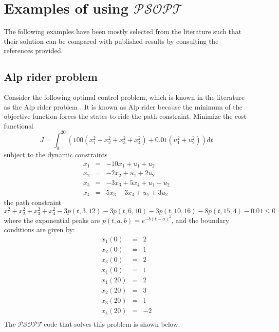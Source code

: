 \documentclass[a4paper,11pt]{report}    %
\newcommand{\psopt}{$\mathcal{PSOPT}$\,}  %
\begin{document}
\chapter{Examples of using  \psopt}

The following examples have been mostly selected from the literature such that their solution
can be compared with published results by consulting the references provided.

\section{Alp rider problem}

Consider the following optimal control problem, which is known in the literature
as the Alp rider problem \cite{Betts:01}. It is known as Alp rider because
the minimum of the objective function forces the states to ride the path constraint. Minimize the cost functional
\begin{equation}
  J = \int_0^{20} ( 100 ( x_1^2 + x_2^2 + x_3^2 + x_4 ^2 ) + 0.01( u_1^2 + u_2^2) ) \mathrm{d}t
\end{equation}
subject to the dynamic constraints
\begin{equation}
  \begin{array}{lcl}
    \dot x_1 & = &  -10 x_1 + u_1 + u_2 \\
    \dot x_2 & = &  -2 x_2 + u_1 + 2u_2 \\
    \dot x_3 & = &  -3 x_3 + 5 x_4 + u_1 - u_2 \\
    \dot x_4 & = &  5 x_3 - 3 x_4 + u_1 + 3 u_2 
  \end{array}
\end{equation}
the path constraint
\begin{equation}
    x_1^2 + x_2^2 + x_3^2 + x_4^2 - 3 p(t,3,12) - 3 p(t, 6, 10) -3 p(t,10,16) - 8 p(t,15,4)-0.01 \le 0
\end{equation}
where the exponential peaks are $p(t,a,b) = e^{-b(t-a)^2}$, 
and the boundary conditions are given by:
\begin{equation}
  \begin{array}{lcl}
    x_1(0) & = & 2 \\
    x_2(0) & = & 1 \\
    x_3(0) & = & 2 \\
    x_4(0) & = & 1 \\
    x_1(20) & = & 2 \\
    x_2(20) & = & 3 \\
    x_3(20) & = & 1 \\
    x_4(20) & = & -2 \\   
  \end{array}
\end{equation}
The \psopt code that solves this problem is shown below.  
\end{document}
